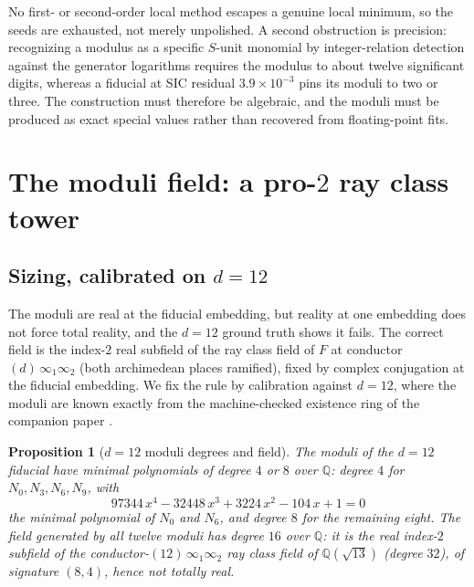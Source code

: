 \documentclass[12pt,a4paper]{article}
\newtheorem{proposition}[theorem]{Proposition}
\newcommand{\Fd}{F}
\begin{document}
No first- or second-order local method escapes a genuine local minimum, so the
seeds are exhausted, not merely unpolished.  A second obstruction is precision:
recognizing a modulus as a specific $S$-unit monomial by integer-relation
detection against the generator logarithms requires the modulus to about twelve
significant digits, whereas a fiducial at SIC residual $3.9\times 10^{-3}$ pins
its moduli to two or three.  The construction must therefore be algebraic, and
the moduli must be produced as exact special values rather than recovered from
floating-point fits.

\section{The moduli field: a pro-$2$ ray class tower}
\label{sec:tower}

\subsection{Sizing, calibrated on $d=12$}

The moduli are real at the fiducial embedding, but reality at one embedding does
not force total reality, and the $d=12$ ground truth shows it fails.  The correct
field is the index-$2$ real subfield of the ray class field of $\Fd$ at conductor
$(d)\,\infty_1\infty_2$ (both archimedean places ramified), fixed by complex
conjugation at the fiducial embedding.  We fix the rule by calibration against
$d=12$, where the moduli are known exactly from the machine-checked existence
ring of the companion paper \cite{StarkHilbert12}.

\begin{proposition}[$d=12$ moduli degrees and field]
\label{prop:d12-deg}
The moduli of the $d=12$ fiducial have minimal polynomials of degree $4$ or $8$
over $\mathbb{Q}$: degree $4$ for $N_0, N_3, N_6, N_9$, with
\[
97344\,x^4 - 32448\,x^3 + 3224\,x^2 - 104\,x + 1 = 0
\]
the minimal polynomial of $N_0$ and $N_6$, and degree $8$ for the remaining
eight.  The field generated by all twelve moduli has degree $16$ over
$\mathbb{Q}$: it is the real index-$2$ subfield of the
conductor-$(12)\,\infty_1\infty_2$ ray class field of $\mathbb{Q}(\sqrt{13})$
(degree $32$), of signature $(8,4)$, hence not totally real.
\end{proposition}
\end{document}
